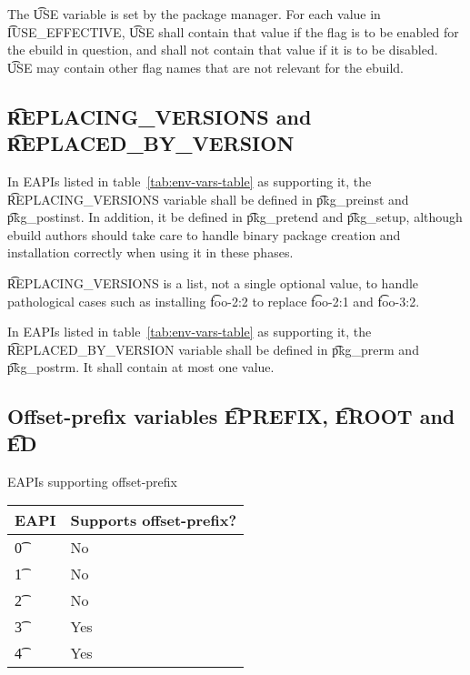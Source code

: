 The \t{USE} variable is set by the package manager. For each value in \t{IUSE\_EFFECTIVE}, \t{USE}
shall contain that value if the flag is to be enabled for the ebuild in question, and shall not
contain that value if it is to be disabled. \t{USE} may contain other flag names that are not
relevant for the ebuild.

\subsection{\t{REPLACING\_VERSIONS} and \t{REPLACED\_BY\_VERSION}}
\label{sec:replacing-versions}

 In EAPIs listed in table~\ref{tab:env-vars-table} as supporting
it, the \t{REPLACING\_VERSIONS} variable shall be defined in \t{pkg\_preinst} and \t{pkg\_postinst}.
In addition, it  be defined in \t{pkg\_pretend} and \t{pkg\_setup}, although ebuild authors
should take care to handle binary package creation and installation correctly when using it in these
phases.

\t{REPLACING\_VERSIONS} is a list, not a single optional value, to handle pathological cases such as
installing \t{foo-2:2} to replace \t{foo-2:1} and \t{foo-3:2}.

In EAPIs listed in table~\ref{tab:env-vars-table} as supporting it, the \t{REPLACED\_BY\_VERSION}
variable shall be defined in \t{pkg\_prerm} and \t{pkg\_postrm}. It shall contain at most one value.

\subsection{Offset-prefix variables \t{EPREFIX}, \t{EROOT} and \t{ED}}
\label{sec:offset-vars}

\begin{centertable}{EAPIs supporting offset-prefix}
    \label{tab:offset-support-table}
    \begin{tabular}{ l l }
        \toprule
        \multicolumn{1}{c}{\textbf{EAPI}} &
        \multicolumn{1}{c}{\textbf{Supports offset-prefix?}}\\
        \midrule
        \t{0} & No \\
        \t{1} & No \\
        \t{2} & No \\
        \t{3} & Yes \\
        \t{4} & Yes \\
        \bottomrule
    \end{tabular}
\end{centertable}

